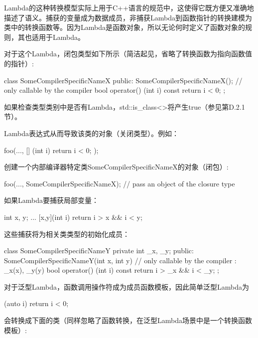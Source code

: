 \begin{notice}
Lambda的这种转换模型实际上用于C++语言的规范中，这使得它既方便又准确地描述了语义。捕获的变量成为数据成员，非捕获Lambda到函数指针的转换建模为类中的转换函数等。因为Lambda是函数对象，所以无论何时定义了函数对象的规则，其也适用于Lambda。
\end{notice}

对于这个Lambda，闭包类型如下所示（简洁起见，省略了转换函数为指向函数值的指针）:

\begin{cpp}
class SomeCompilerSpecificNameX {
	public:
	SomeCompilerSpecificNameX(); // only callable by the compiler
	bool operator() (int i) const
	{
		return i < 0;
	}
};
\end{cpp}

如果检查类型类别中是否有Lambda，std::is\_class<>将产生true（参见第D.2.1节）。

Lambda表达式从而导致该类的对象（关闭类型）。例如：

\begin{cpp}
foo(...,
	[] (int i) {
		return i < 0;
	});
\end{cpp}

创建一个内部编译器特定类SomeCompilerSpecificNameX的对象（闭包）:

\begin{cpp}
foo(...,
	SomeCompilerSpecificNameX{}); // pass an object of the closure type
\end{cpp}

如果Lambda要捕获局部变量：

\begin{cpp}
int x, y;
...
[x,y](int i) {
	return i > x && i < y;
}
\end{cpp}

这些捕获将为相关类类型的初始化成员：

\begin{cpp}
class SomeCompilerSpecificNameY {
private
	int _x, _y;
public:
	SomeCompilerSpecificNameY(int x, int y) // only callable by the compiler
	: _x(x), _y(y) {
	}
	bool operator() (int i) const {
		return i > _x && i < _y;
	}
};
\end{cpp}

对于泛型Lambda，函数调用操作符成为成员函数模板，因此简单泛型Lambda为

\begin{cpp}
[] (auto i) {
	return i < 0;
}
\end{cpp}

会转换成下面的类（同样忽略了函数转换，在泛型Lambda场景中是一个转换函数模板）:

